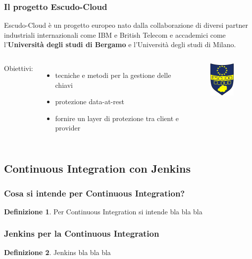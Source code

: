 \documentclass{beamer}
\theoremstyle{definition}
\newtheorem{definizione}{Definizione}
\theoremstyle{plain}
\begin{document}
\begin{frame}
\frametitle{Il progetto Escudo-Cloud}
\alert{Escudo-Cloud} è un progetto europeo nato dalla collaborazione di diversi partner industriali internazionali come IBM e British Telecom e accademici come l'\textbf{Università degli studi di Bergamo} e l'Università degli studi di Milano.\\
\vspace*{1cm}
\begin{columns}
Obiettivi:
\begin{itemize}
\item
tecniche e metodi per la gestione delle chiavi
\item
protezione data-at-rest
\item
fornire un layer di protezione tra client e provider
\end{itemize}
\begin{figure}[!h]
	\begin{center}
\includegraphics[width=1.5cm]{ESCUDO-CLOUD.png}
\end{center}
\end{figure}
\end{columns}
\end{frame}
\subsection{Continuous Integration con Jenkins}
\begin{frame}
\frametitle{Cosa si intende per Continuous Integration?}
\begin{definizione}
Per \alert{Continuous Integration} si intende  bla bla bla
\end{definizione}
\end{frame}


\begin{frame}
\frametitle{Jenkins per la Continuous Integration}
\begin{definizione}
\alert{Jenkins} bla bla bla
\end{definizione}
\end{frame}
\end{document}
